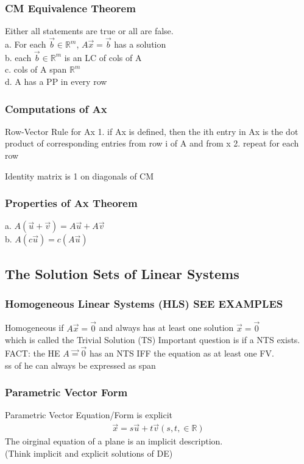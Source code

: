\documentclass[12pt]{article}
\newcommand{\R}{\mathbb{R}}
\begin{document}
    \subsubsection{CM Equivalence Theorem}
        Either all statements are true or all are false. \\
        a. For each $ \vec b \in \R^m $, $ A\vec x= \vec b $  has a solution \\
        b. each $ \vec b \in \R^m $ is an LC of cols of A \\
        c. cols of A span $ \R^{m} $  \\
        d. A has a PP in every row 
    \subsubsection{Computations of Ax}
        \par{Row-Vector Rule for Ax}
        1. if Ax is defined, then the ith entry in Ax is the dot product
        of corresponding entries from row i of A and from x
        2. repeat for each row
        \par
       Identity matrix is 1 on diagonals of CM
    \subsubsection{Properties of Ax Theorem}
    a. $ A(\vec u + \vec v) = A\vec u + A\vec v $ \\
    b. $ A(c\vec u) = c(A\vec u)$ 
\subsection{The Solution Sets of Linear Systems}
    \subsubsection{Homogeneous Linear Systems (HLS) SEE EXAMPLES}
            Homogeneous if $ A\vec x = \vec 0 $  and always has
            at least one solution $ \vec x = \vec 0 $   \\
            which is called the Trivial Solution (TS)
            Important question is if a NTS exists.
            FACT: the HE $ A\vec = \vec 0 $  has an NTS IFF the equation as
            at least one FV. \\
            ss of he can always be expressed as span 
    \subsubsection{Parametric Vector Form}
        Parametric Vector Equation/Form is explicit
        \begin{align*}
            \vec x = s\vec u + t\vec v (s,t, \in\R)
        \end{align*}
        The oirginal equation of a plane is an implicit description. \\
        (Think implicit and explicit solutions of DE)
\end{document}
